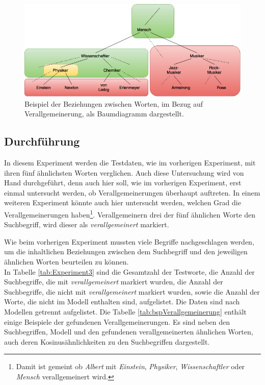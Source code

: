 \documentclass[12pt,a4paper]{report}
\begin{document}
\begin{figure}[h]
  \begin{center}
	\includegraphics[scale=0.55]{Verallgemeinerung_Baum2.png}
  \end{center}  
  \caption{Beispiel der Beziehungen zwischen Worten, im Bezug auf Verallgemeinerung, als Baumdiagramm dargestellt.}
  \label{pic:Verallgemeinerung}
\end{figure}
		
		\subsection*{Durchführung}
		In diesem Experiment werden die Testdaten, wie im vorherigen Experiment, mit ihren fünf ähnlichsten Worten verglichen. Auch diese Untersuchung wird von Hand durchgeführt, denn auch hier soll, wie im vorherigen Experiment, erst einmal untersucht werden, ob Verallgemeinerungen überhaupt auftreten. In einem weiteren Experiment könnte auch hier untersucht werden, welchen Grad die Verallgemeinerungen haben\footnote{Damit ist gemeint ob \textit{Albert} mit \textit{Einstein}, \textit{Physiker}, \textit{Wissenschaftler} oder \textit{Mensch} verallgemeinert wird.}. Verallgemeinern drei der fünf ähnlichen Worte den Suchbegriff, wird dieser als \textit{verallgemeinert} markiert. 
		
		
		Wie beim vorherigen Experiment mussten viele Begriffe nachgeschlagen werden,  um die inhaltlichen Beziehungen zwischen dem Suchbegriff und den jeweiligen ähnlichen Worten beurteilen zu können.\\
		
In Tabelle \ref{tab:Experiment3} sind die Gesamtzahl der Testworte, die Anzahl der Suchbegriffe, die mit \textit{verallgemeinert} markiert wurden, die Anzahl der Suchbegriffe,  die nicht mit \textit{verallgemeinert} markiert wurden, sowie die Anzahl der Worte, die nicht im Modell enthalten sind, aufgelistet. Die Daten sind nach Modellen getrennt aufgelistet. Die Tabelle \ref{tab:bspVerallgemeinerung} enthält einige Beispiele der gefundenen Verallgemeinerungen. Es sind neben den Suchbegriffen, Modell und den gefundenen verallgemeinerten ähnlichen Worten, auch deren Kosinusähnlichkeiten zu den Suchbegriffen dargestellt.
		
\end{document}
